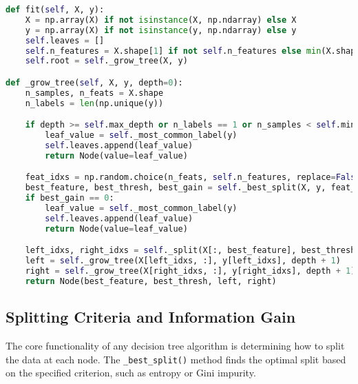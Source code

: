 \documentclass{article}
\begin{document}
\begin{lstlisting}[language=Python, caption=Tree Growth Process]
def fit(self, X, y):
    X = np.array(X) if not isinstance(X, np.ndarray) else X
    y = np.array(X) if not isinstance(y, np.ndarray) else y       
    self.leaves = []
    self.n_features = X.shape[1] if not self.n_features else min(X.shape[1], self.n_features)
    self.root = self._grow_tree(X, y)

def _grow_tree(self, X, y, depth=0):
    n_samples, n_feats = X.shape
    n_labels = len(np.unique(y))

    if depth >= self.max_depth or n_labels == 1 or n_samples < self.min_samples_split:
        leaf_value = self._most_common_label(y)
        self.leaves.append(leaf_value)
        return Node(value=leaf_value)

    feat_idxs = np.random.choice(n_feats, self.n_features, replace=False)
    best_feature, best_thresh, best_gain = self._best_split(X, y, feat_idxs)
    if best_gain == 0:
        leaf_value = self._most_common_label(y)
        self.leaves.append(leaf_value)
        return Node(value=leaf_value)

    left_idxs, right_idxs = self._split(X[:, best_feature], best_thresh)
    left = self._grow_tree(X[left_idxs, :], y[left_idxs], depth + 1)
    right = self._grow_tree(X[right_idxs, :], y[right_idxs], depth + 1)
    return Node(best_feature, best_thresh, left, right)
\end{lstlisting}

\subsection{Splitting Criteria and Information Gain}
The core functionality of any decision tree algorithm is determining how to split the data at each node. The \texttt{\_best\_split()} method finds the optimal split based on the specified criterion, such as entropy or Gini impurity.
\end{document}
